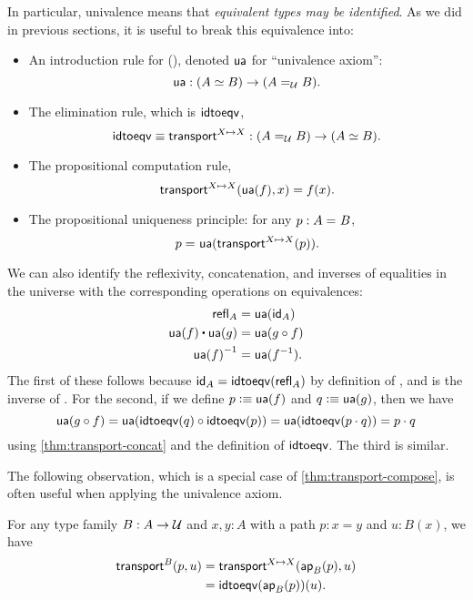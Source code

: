 In particular, univalence means that \emph{equivalent types may be identified}.
As we did in previous sections, it is useful to break this equivalence into:
%
\begin{itemize}
\item An introduction rule for {()}, denoted $\ua$ for ``univalence axiom'':
  \[
  \ua : ({\eqv A B}) \to (\id[\type]{A}{B}).
  \]
\item The elimination rule, which is $\idtoeqv$,
  \[
  \idtoeqv \jdeq \transfibf{X \mapsto X} : (\id[\type]{A}{B}) \to (\eqv A B).
  \]
\item The propositional computation rule,
  \[
  \transfib{X \mapsto X}{\ua(f)}{x} = f(x).
  \]
\item The propositional uniqueness principle: 
  for any $p : \id A B$,
  \[
  \id{p}{\ua(\transfibf{X \mapsto X}(p))}.
  \]
\end{itemize}
%
We can also identify the reflexivity, concatenation, and inverses of equalities in the universe with the corresponding operations on equivalences:
\begin{align*}
  \refl{A} &= \ua(\idfunc[A]) \\
  \ua(f) \ct \ua(g) &= \ua(g\circ f) \\
  \opp{\ua(f)} &= \ua(f^{-1}).
\end{align*}
The first of these follows because $\idfunc[A] = \idtoeqv(\refl{A})$ by definition of \idtoeqv, and \ua is the inverse of \idtoeqv.
For the second, if we define $p \defeq \ua(f)$ and $q\defeq \ua(g)$, then we have
\[ \ua(g\circ f) = \ua(\idtoeqv(q) \circ \idtoeqv(p)) = \ua(\idtoeqv(p\cdot q)) = p\cdot q\]
using \autoref{thm:transport-concat} and the definition of $\idtoeqv$.
The third is similar.

The following observation, which is a special case of \autoref{thm:transport-compose}, is often useful when applying the univalence axiom.

\begin{lem}\label{thm:transport-is-ap}
  For any type family $B:A\to\type$ and $x,y:A$ with a path $p:x=y$ and $u:B(x)$, we have
  \begin{align*}
    \transfib{B}{p}{u} &= \transfib{X\mapsto X}{\apfunc{B}(p)}{u}\\
    &= \idtoeqv(\apfunc{B}(p))(u).
  \end{align*}
\end{lem}

